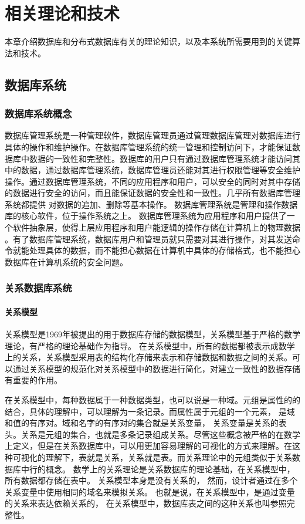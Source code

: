 
\chapter{相关理论和技术}
本章介绍数据库和分布式数据库有关的理论知识，以及本系统所需要用到的关键算法和技术。
\section{数据库系统}
\subsection{数据库系统概念}
数据库管理系统是一种管理软件，数据库管理员通过管理数据库管理对数据库进行具体的操作和维护操作。在数据库管理系统的统一管理和控制访问下，才能保证数据库中数据的一致性和完整性。数据库的用户只有通过数据库管理系统才能访问其中的数据，通过数据库管理系统，数据库管理员还能对其进行权限管理等安全维护操作。通过数据库管理系统，不同的应用程序和用户，可以安全的同时对其中存储的数据进行安全的访问，而且能保证数据的安全性和一致性。几乎所有数据库管理系统都提供
对数据的追加、删除等基本操作。
数据库管理系统是管理和操作数据库的核心软件，位于操作系统之上。
数据库管理系统为应用程序和用户提供了一个软件抽象层，使得上层应用程序和用户能逻辑的操作存储在计算机上的物理数据
。有了数据库管理系统，数据库用户和管理员就只需要对其进行操作，对其发送命令就能处理具体的数据，而不能担心数据在计算机中具体的存储格式，也不能担心数据库在计算机系统的安全问题。
\subsection{关系数据库系统}
\subsubsection{关系模型}
关系模型是1969年被提出的用于数据库存储的数据模型，关系模型基于严格的数学理论，有严格的理论基础作为指导。
在关系模型中，所有的数据都被表示成数学上的关系，关系模型采用表的结构化存储来表示和存储数据和数据之间的关系。可以通过关系模型的规范化对关系模型中的数据进行简化，对建立一致性的数据存储有重要的作用。

在关系模型中，每种数据属于一种数据类型，也可以说是一种域。元组是属性的的结合，具体的理解中，可以理解为一条记录。而属性属于元组的一个元素，
是域和值的有序对。域和名字的有序对的集合就是关系变量，
关系变量是关系的表头。关系是元组的集合，也就是多条记录组成关系。尽管这些概念被严格的在数学上定义，但是在关系数据库中，可以用更加容易理解的可视化的方式来理解。在这种可视化的理解下，表就是关系，关系就是表。而关系理论中的元组类似于关系数据库中行的概念。
数学上的关系理论是关系数据库的理论基础，在关系模型中，所有数据都存储在表中。
关系模型本身是没有关系的，
然而，设计者通过在多个关系变量中使用相同的域名来模拟关系。
也就是说，在关系模型中，是通过变量的关系来表达依赖关系的，
在关系模型中，数据库表之间的这种关系也叫参照完整性。


